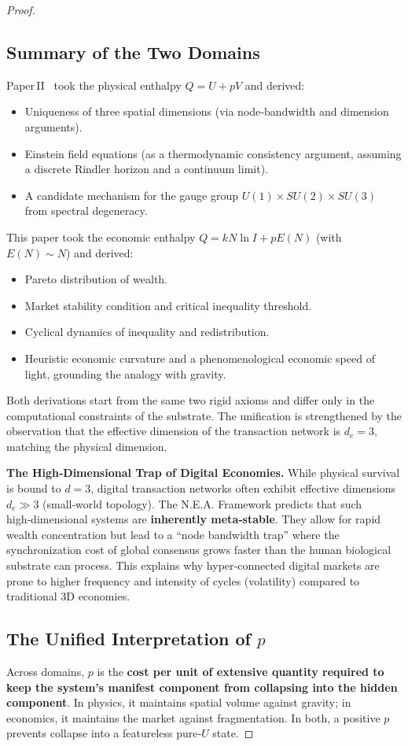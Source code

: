 \documentclass{article}
\begin{document}
\begin{proof}
\subsection{Summary of the Two Domains}
Paper II~\cite{paperII} took the physical enthalpy $Q = U + pV$ and derived:
\begin{itemize}
    \item Uniqueness of three spatial dimensions (via node‑bandwidth and dimension arguments).
    \item Einstein field equations (as a thermodynamic consistency argument, assuming a discrete Rindler horizon and a continuum limit).
    \item A candidate mechanism for the gauge group $U(1) \times SU(2) \times SU(3)$ from spectral degeneracy.
\end{itemize}
This paper took the economic enthalpy $Q = k N \ln I + pE(N)$ (with $E(N) \sim N$) and derived:
\begin{itemize}
    \item Pareto distribution of wealth.
    \item Market stability condition and critical inequality threshold.
    \item Cyclical dynamics of inequality and redistribution.
    \item Heuristic economic curvature and a phenomenological economic speed of light, grounding the analogy with gravity.
\end{itemize}
Both derivations start from the same two rigid axioms and differ only in the computational constraints of the substrate. The unification is strengthened by the observation that the effective dimension of the transaction network is $d_e = 3$, matching the physical dimension.

\textbf{The High‑Dimensional Trap of Digital Economies.} While physical survival is bound to $d=3$, digital transaction networks often exhibit effective dimensions $d_e \gg 3$ (small‑world topology). The N.E.A. Framework predicts that such high‑dimensional systems are \textbf{inherently meta‑stable}. They allow for rapid wealth concentration but lead to a “node bandwidth trap” where the synchronization cost of global consensus grows faster than the human biological substrate can process. This explains why hyper‑connected digital markets are prone to higher frequency and intensity of cycles (volatility) compared to traditional 3D economies.

\subsection{The Unified Interpretation of $p$}
Across domains, $p$ is the \textbf{cost per unit of extensive quantity required to keep the system’s manifest component from collapsing into the hidden component}. In physics, it maintains spatial volume against gravity; in economics, it maintains the market against fragmentation. In both, a positive $p$ prevents collapse into a featureless pure‑$U$ state.


\end{proof}
\end{document}
